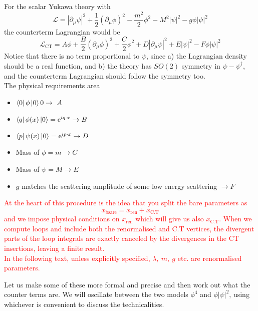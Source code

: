 \documentclass[11pt]{article}
\newcommand{\del}{\partial}
\newcommand{\e}{\mathrm{e}}
\newcommand{\ld}{\mathcal{L}}
\numberwithin{equation}{section}
\begin{document}
For the scalar Yukawa theory with 
\begin{equation*}
    \ld = |\del_\mu \psi|^2 + \frac{1}{2}(\del_\mu \phi)^2 - \frac{m^2}{2}\phi^2 - M^2|\psi|^2 - g\phi|\psi|^2
\end{equation*}
the counterterm Lagrangian would be 
\begin{equation*}
    \ld_{\text{CT}} = A\phi + \frac{B}{2}(\del_\mu \phi)^2 + \frac{C}{2}\phi^2 + D|\del_\mu \psi|^2  + E|\psi|^2 - F\phi|\psi|^2
\end{equation*}
Notice that there is no term proportional to \(\psi\), since a) the Lagrangian density should be a real function, and b) the theory has \(SO(2)\) symmetry in \(\psi-\psi^\dagger\), and the counterterm Lagrangian should follow the symmetry too.\\
The physical requirements area
\begin{itemize}
    \item \(\bra{0}\phi\ket{0} 0 \to~A\)
    \item \(\bra{q}\phi(x)\ket{0} = \e^{iq\cdot x} \to B\)
    \item \(\bra{p}\psi(x)\ket{0} = \e^{ip\cdot x} \to D\)
    \item Mass of \(\phi = m \to C\)
    \item Mass of \(\psi = M \to E\)
    \item \(g\) matches the scattering amplitude of some low energy scattering \(\to F\) 
\end{itemize}

\textcolor{red}{
    At the heart of this procedure is the idea that you split the bare parameters as 
    \begin{equation*}
        x_{\text{bsare}} = x_{\text{ren}} + x_{\text{C.T}}
    \end{equation*}
    and we impose physical conditions on \(x_{\text{ren}}\) which will give us also \(x_{\text{C.T}}\). When we compute loops and include both the renormalised and C.T vertices, the divergent parts of the loop integrals are exactly canceled by the divergences in the CT insertions, leaving a finite result.\\
    In the following text, unless explicitly specified, \(\lambda,~m,~g\) etc. are renormalised parameters.\\
}

Let us make some of these more formal and precise and then work out what the counter terms are. We will oscillate between the two models \(\phi^4\) and \(\phi|\psi|^2\), using whichever is convenient to discuss the technicalities. 
\end{document}
